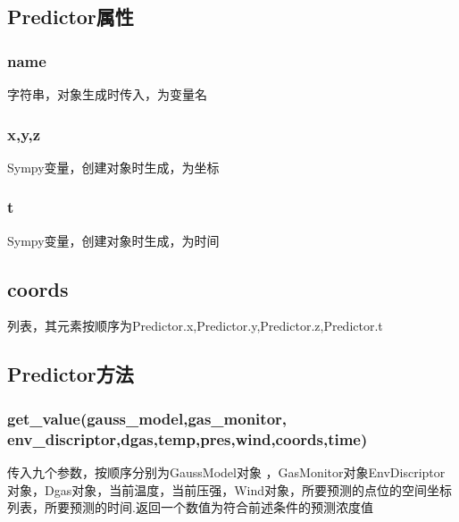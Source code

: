 \documentclass[]{ctexart}
\begin{document}
\subsection{Predictor属性}
\subsubsection{name}
字符串，对象生成时传入，为变量名
\subsubsection{x,y,z}
Sympy变量，创建对象时生成，为坐标
\subsubsection{t}
Sympy变量，创建对象时生成，为时间
\subsection{coords}
列表，其元素按顺序为Predictor.x,Predictor.y,Predictor.z,Predictor.t
\subsection{Predictor方法}
\subsubsection{get\_value(gauss\_model,gas\_monitor,\\env\_discriptor,dgas,temp,pres,wind,coords,time)}
传入九个参数，按顺序分别为GaussModel对象 ，GasMonitor对象EnvDiscriptor对象，Dgas对象，当前温度，当前压强，Wind对象，所要预测的点位的空间坐标列表，所要预测的时间.返回一个数值为符合前述条件的预测浓度值
\end{document}
